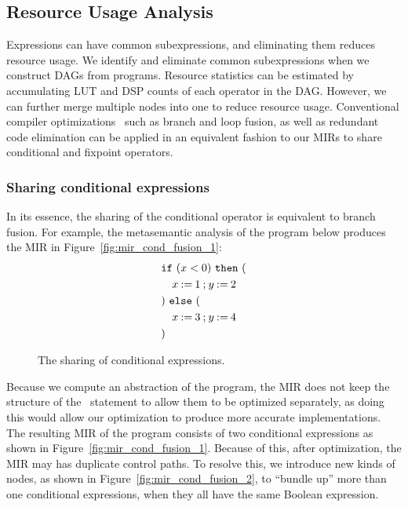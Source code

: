 \subsection{Resource Usage Analysis}
\label{sub:resource_usage_analysis}

Expressions can have common subexpressions, and eliminating them reduces
resource usage.  We identify and eliminate common subexpressions when we
construct DAGs from programs.  Resource statistics can be estimated by
accumulating LUT and DSP counts of each operator in the DAG\@.  However, we can
further merge multiple nodes into one to reduce resource usage.  Conventional
compiler optimizations~\cite{kuck81} such as branch and loop fusion, as well as
redundant code elimination can be applied in an equivalent fashion to our MIRs
to share conditional and fixpoint operators.

\subsubsection{Sharing conditional expressions}

In its essence, the sharing of the conditional operator is equivalent to branch
fusion.  For example, the metasemantic analysis of the program below produces
the MIR in Figure~\ref{fig:mir_cond_fusion_1}:
\begin{equation}
    \begin{aligned}
        & \texttt{if}~(x < 0)~\texttt{then}~( \\
        & \quad x\mathbin{:=}{1} \mathbin{;}
                y\mathbin{:=}{2} \\
        & )~\texttt{else}~( \\
        & \quad x\mathbin{:=}{3} \mathbin{;}
                y\mathbin{:=}{4} \\
        & )
    \end{aligned}
\end{equation}

\begin{figure}[ht]
    \centering
    \quad
    \caption{The sharing of conditional expressions.}
\end{figure}

Because we compute an abstraction of the program, the MIR does not keep
the structure of the \iflit~statement to allow them to be optimized
separately, as doing this would allow our optimization to produce more
accurate implementations.  The resulting MIR of the program consists of two
conditional expressions as shown in Figure~\ref{fig:mir_cond_fusion_1}.
Because of this, after optimization, the MIR may has duplicate control
paths.  To resolve this, we introduce new kinds of nodes, as shown in
Figure~\ref{fig:mir_cond_fusion_2}, to ``bundle up'' more than one conditional
expressions, when they all have the same Boolean expression.


